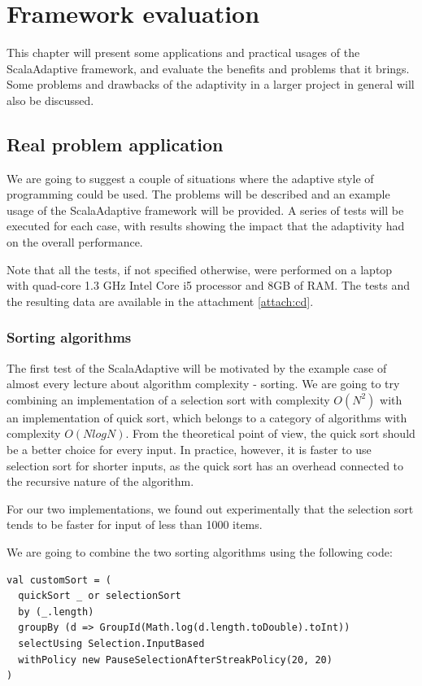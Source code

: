 \chapter{Framework evaluation}

This chapter will present some applications and practical usages of the ScalaAdaptive framework, and evaluate the benefits and problems that it brings. Some problems and drawbacks of the adaptivity in a larger project in general will also be discussed.

\section{Real problem application}

We are going to suggest a couple of situations where the adaptive style of programming could be used. The problems will be described and an example usage of the ScalaAdaptive framework will be provided. A series of tests will be executed for each case, with results showing the impact that the adaptivity had on the overall performance.

Note that all the tests, if not specified otherwise, were performed on a laptop with quad-core 1.3 GHz Intel Core i5 processor and 8GB of RAM. The tests and the resulting data are available in the attachment \ref{attach:cd}.

\subsection{Sorting algorithms}

The first test of the ScalaAdaptive will be motivated by the example case of almost every lecture about algorithm complexity - sorting. We are going to try combining an implementation of a selection sort with complexity $O(N^2)$ with an implementation of quick sort, which belongs to a category of algorithms with complexity $O(N logN)$. From the theoretical point of view, the quick sort should be a better choice for every input. In practice, however, it is faster to use selection sort for shorter inputs, as the quick sort has an overhead connected to the recursive nature of the algorithm.

For our two implementations, we found out experimentally that the selection sort tends to be faster for input of less than 1000 items.

We are going to combine the two sorting algorithms using the following code:
\lstset{style=Scala}
\begin{lstlisting}
val customSort = (
  quickSort _ or selectionSort
  by (_.length) 
  groupBy (d => GroupId(Math.log(d.length.toDouble).toInt))
  selectUsing Selection.InputBased 
  withPolicy new PauseSelectionAfterStreakPolicy(20, 20)
)
\end{lstlisting}


